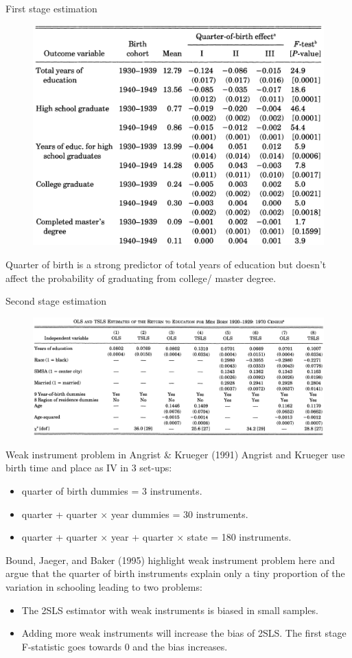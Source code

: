 \documentclass{beamer}
\begin{document}
\begin{frame}{First stage estimation}
\begin{figure}
\centering
\includegraphics[width=0.5\linewidth]{./Figures/angristkrueger5}
\end{figure}
\footnotesize Quarter of birth is a strong predictor of total years of education but doesn't  affect the probability of graduating from college/ master degree.
\end{frame}

\begin{frame}{Second stage estimation}
\begin{figure}
\centering
\includegraphics[width=0.95\linewidth]{./Figures/angristkrueger4_}
\end{figure}
\end{frame}

\begin{frame}{Weak instrument problem in Angrist \& Krueger (1991)}
Angrist and Krueger use birth time and place as IV in 3 set-ups:
\begin{itemize}
\item quarter of birth dummies = 3 instruments.
\item quarter  + quarter $\times$ year dummies = 30
instruments.
\item quarter + quarter $\times$ year + quarter $\times$ state = 180 instruments.
\end{itemize}\bigskip

Bound, Jaeger, and Baker (1995) highlight weak instrument problem here and argue that the quarter of birth instruments explain only a tiny proportion of the variation in schooling leading to two problems:
\begin{itemize}
\item The 2SLS estimator with weak instruments is biased in small samples. 
\item Adding more weak instruments will increase the bias of 2SLS. The first stage
F-statistic goes towards 0 and the bias increases.
\end{itemize}\end{frame}
\end{document}
